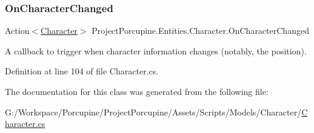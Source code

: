 \subsubsection{\texorpdfstring{On\+Character\+Changed}{OnCharacterChanged}}
{\footnotesize\ttfamily Action$<$\hyperlink{class_project_porcupine_1_1_entities_1_1_character}{Character}$>$ Project\+Porcupine.\+Entities.\+Character.\+On\+Character\+Changed}



A callback to trigger when character information changes (notably, the position). 



Definition at line 104 of file Character.\+cs.



The documentation for this class was generated from the following file\+:\begin{DoxyCompactItemize}
\item 
G\+:/\+Workspace/\+Porcupine/\+Project\+Porcupine/\+Assets/\+Scripts/\+Models/\+Character/\hyperlink{_character_8cs}{Character.\+cs}\end{DoxyCompactItemize}
